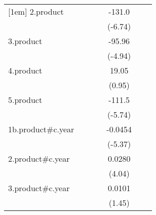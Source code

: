 {\begin{tabular}{l*{6}{c}}
[1em]
2.product           &                     &                     &                     &      -131.0\sym{***}&                     &                     \\
                    &                     &                     &                     &     (-6.74)         &                     &                     \\
[1em]
3.product           &                     &                     &                     &      -95.96\sym{***}&                     &                     \\
                    &                     &                     &                     &     (-4.94)         &                     &                     \\
[1em]
4.product           &                     &                     &                     &       19.05         &                     &                     \\
                    &                     &                     &                     &      (0.95)         &                     &                     \\
[1em]
5.product           &                     &                     &                     &      -111.5\sym{***}&                     &                     \\
                    &                     &                     &                     &     (-5.74)         &                     &                     \\
[1em]
1b.product#c.year   &                     &                     &                     &     -0.0454\sym{***}&                     &                     \\
                    &                     &                     &                     &     (-5.37)         &                     &                     \\
[1em]
2.product#c.year    &                     &                     &                     &      0.0280\sym{***}&                     &                     \\
                    &                     &                     &                     &      (4.04)         &                     &                     \\
[1em]
3.product#c.year    &                     &                     &                     &      0.0101         &                     &                     \\
                    &                     &                     &                     &      (1.45)         &                     &                     \\

\end{tabular}}
